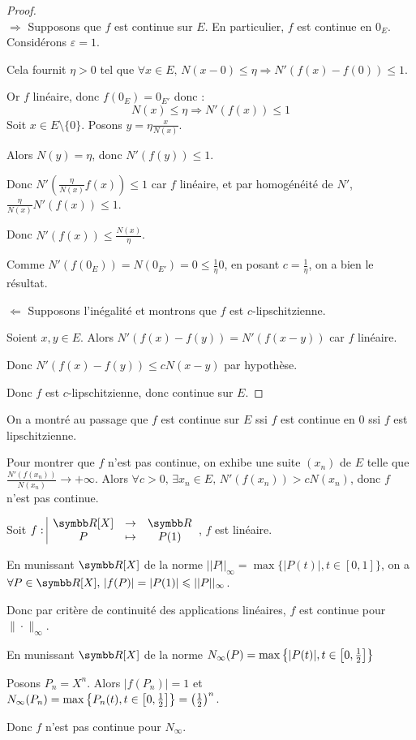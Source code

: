 \begin{proof}~\\
    $\Rightarrow$ Supposons que $f$ est continue sur $E$. En particulier, $f$ est 
    continue en $0_E$. Considérons $\varepsilon = 1$.

    Cela fournit $\eta > 0$ tel que $\forall x \in E, \, N(x - 0) \leqslant \eta \Rightarrow N'(f(x) - f(0)) \leqslant 1$.

    Or $f$ linéaire, donc $f(0_E) = 0_{E'}$ donc :
    \[N(x) \leqslant \eta \Rightarrow N'(f(x)) \leqslant 1\]
    Soit $x \in E \setminus \{0\}$. 
    Posons $\displaystyle y = \eta \frac {x}{N(x)} $.

    Alors $N(y) = \eta$, donc $N'(f(y)) \leqslant 1$.

    Donc $N'\left( \frac{\eta }{N(x)} f(x) \right) \leqslant 1$ car $f$ linéaire, 
    et par homogénéité de $N'$, $ \frac{\eta }{N(x)} N'(f(x)) \leqslant 1$.

    Donc $N'(f(x)) \leqslant \frac{N(x)}{\eta}$.

    Comme $N'(f(0_E)) = N(0_{E'}) = 0 \leqslant \frac 1 \eta 0 $, 
    en posant $c = \frac 1 \eta$, on a bien le résultat. 

    \lvspace $\Leftarrow$ Supposons l'inégalité et montrons que $f$ est $c$-lipschitzienne. 

    Soient $x, y \in E$. Alors $N'(f(x) - f(y)) = N'(f(x - y)) $ car $f$ linéaire.

    Donc $N'(f(x) - f(y)) \leqslant c N(x - y)$ par hypothèse. 

    Donc $f$ est $c$-lipschitzienne, donc continue sur $E$.
\end{proof}

\begin{remarque}
    On a montré au passage que $f$ est continue sur $E$ ssi $f$ est continue en $0$ ssi $f$ est lipschitzienne.  

    Pour montrer que $f$ n'est pas continue, on exhibe une suite $(x_n)$ de $E$ 
    telle que $\displaystyle \frac{N'(f(x_n))}{N(x_n)} \to + \infty$. Alors $\forall c > 0, \, \exists x_n \in E, \, N'(f(x_n)) > c N(x_n)$, 
    donc $f$ n'est pas continue.
\end{remarque}

\begin{exemple}
    Soit $\fonction f {\R[X]} \R P {P(1)}$, $f$ est linéaire. 

    \avspace En munissant $\R[X]$ de la norme $||P||_\infty = \max\{|P(t)|, t \in [0, 1]\}$, on a 
    $\forall P \in \R[X], \, |f(P)| = |P(1)| \leqslant ||P||_\infty$.

    Donc par critère de continuité des applications linéaires, $f$ est continue pour $\|\cdot\|_{\infty}$.

    \avspace En munissant $\R[X]$ de la norme $N_\infty(P) = \max\left\{|P(t)|, t \in \left[0, \frac 1 2\right]\right\}$

    Posons $P_n = X^n$. Alors $| f(P_n) | = 1$ et $N_\infty(P_n) = \max\left\{P_n(t), t \in \left[0, \frac 1 2\right]\right\} = \left(\frac 1 2\right)^n$.

    Donc $f$ n'est pas continue pour $N_{\infty}$.
\end{exemple}


